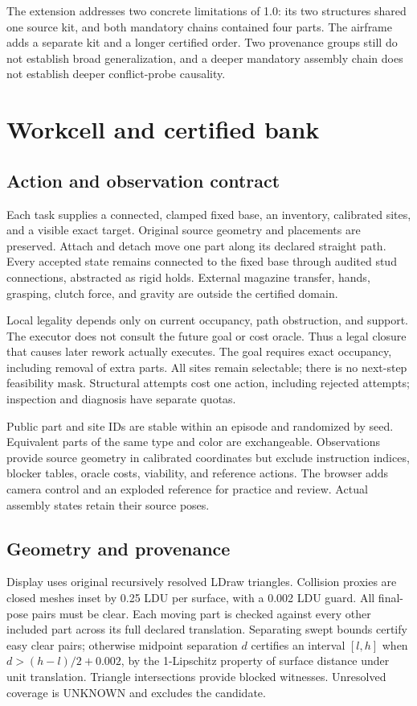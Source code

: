 \documentclass[10pt,twocolumn]{article}
\begin{document}
The extension addresses two concrete limitations of 1.0: its two structures
shared one source kit, and both mandatory chains contained four parts.
The airframe adds a separate kit and a longer certified order. Two provenance
groups still do not establish broad generalization, and a deeper mandatory
assembly chain does not establish deeper conflict-probe causality.

\section{Workcell and certified bank}
\subsection{Action and observation contract}
Each task supplies a connected, clamped fixed base, an inventory, calibrated
sites, and a visible exact target. Original source geometry and placements are
preserved. Attach and detach move one part along its declared straight path.
Every accepted state remains connected to the fixed base through audited stud
connections, abstracted as rigid holds. External magazine transfer, hands,
grasping, clutch force, and gravity are outside the certified domain.

Local legality depends only on current occupancy, path obstruction, and support.
The executor does not consult the future goal or cost oracle. Thus a legal
closure that causes later rework actually executes. The goal requires exact
occupancy, including removal of extra parts. All sites remain selectable;
there is no next-step feasibility mask. Structural attempts cost one action,
including rejected attempts; inspection and diagnosis have separate quotas.

Public part and site IDs are stable within an episode and randomized by seed.
Equivalent parts of the same type and color are exchangeable. Observations
provide source geometry in calibrated coordinates but exclude instruction
indices, blocker tables, oracle costs, viability, and reference actions.
The browser adds camera control and an exploded reference for practice and
review. Actual assembly states retain their source poses.

\subsection{Geometry and provenance}
Display uses original recursively resolved LDraw triangles. Collision proxies
are closed meshes inset by 0.25 LDU per surface, with a 0.002 LDU guard.
All final-pose pairs must be clear. Each moving part is checked against every
other included part across its full declared translation. Separating swept
bounds certify easy clear pairs; otherwise midpoint separation $d$ certifies
an interval $[l,h]$ when $d>(h-l)/2+0.002$, by the 1-Lipschitz property of
surface distance under unit translation. Triangle intersections provide blocked
witnesses. Unresolved coverage is UNKNOWN and excludes the candidate.
\end{document}
